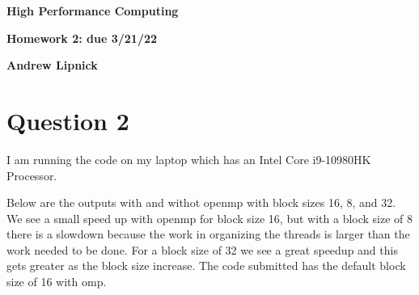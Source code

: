 \documentclass{article}
\begin{document}
\begin{center}
\textbf{High Performance Computing}

\textbf{Homework 2: due 3/21/22}

\textbf{Andrew Lipnick}

\end{center}

\section*{Question 2}
I am running the code on my laptop which has an Intel Core i9-10980HK Processor. 

Below are the outputs with and withot openmp with block sizes 16, 8, and 32. We see a small speed up with openmp for block size 16, but with a block size of 8 there is a slowdown because the work in organizing the threads is larger than the work needed to be done. For a block size of 32 we see a great speedup and this gets greater as the block size increase. The code submitted has the default block size of 16 with omp.
\end{document}

